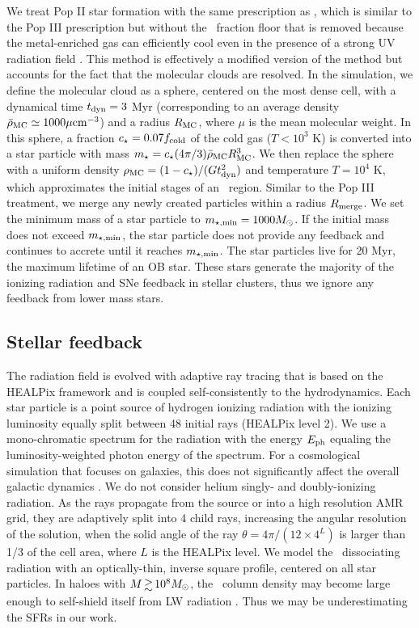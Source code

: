\documentclass[useAMS,usenatbib]{mn2e}
\begin{document}
We treat Pop II star formation with the same prescription as
\citet{Wise09}, which is similar to the Pop III prescription but
without the \hh~fraction floor that is removed because the
metal-enriched gas can efficiently cool even in the presence of a
strong UV radiation field \citep[e.g.][]{Safranek10}.  This method is
effectively a modified version of the \citet{Cen92} method but
accounts for the fact that the molecular clouds are resolved.  In the
simulation, we define the molecular cloud as a sphere, centered on the
most dense cell, with a dynamical time $t_{\rm dyn} = 3$ Myr
(corresponding to an average density $\bar{\rho}_{\rm MC} \simeq
1000\mu \cubecm$) and a radius $R_{\rm MC}$, where $\mu$ is the mean
molecular weight.  In this sphere, a fraction $c_\star = 0.07 f_{\rm
  cold}$ of the cold gas ($T < 10^3$ K) is converted into a star
particle with mass $m_\star = c_\star (4\pi/3) \bar{\rho}_{\rm MC}
R_{\rm MC}^3$.  We then replace the sphere with a uniform density
$\rho_{\rm MC} = (1 - c_\star) / (Gt_{\rm dyn}^2)$ and temperature $T
= 10^4$ K, which approximates the initial stages of an \hii~region.
Similar to the Pop III treatment, we merge any newly created particles
within a radius $R_{\rm merge}$.  We set the minimum mass of a star
particle to $m_{\rm \star, min} = 1000 \Ms$.  If the initial mass does
not exceed $m_{\rm \star, min}$, the star particle does not provide
any feedback and continues to accrete until it reaches $m_{\rm \star,
  min}$.  The star particles live for 20 Myr, the maximum lifetime of
an OB star.  These stars generate the majority of the ionizing
radiation and SNe feedback in stellar clusters, thus we ignore any
feedback from lower mass stars.

\subsection{Stellar feedback}

The radiation field is evolved with adaptive ray tracing
\citep{Abel02_RT, Wise10} that is based on the HEALPix framework
\citep{HEALPix} and is coupled self-consistently to the hydrodynamics.
Each star particle is a point source of hydrogen ionizing radiation
with the ionizing luminosity equally split between 48 initial rays
(HEALPix level 2).  We use a mono-chromatic spectrum for the radiation
with the energy $E_{\rm ph}$ equaling the luminosity-weighted photon
energy of the spectrum.  For a cosmological simulation that focuses on
galaxies, this does not significantly affect the overall galactic
dynamics \citep[see Sec. 6.3 in][]{Wise10}.  We do not consider helium
singly- and doubly-ionizing radiation.  As the rays propagate from the
source or into a high resolution AMR grid, they are adaptively split
into 4 child rays, increasing the angular resolution of the solution,
when the solid angle of the ray $\theta = 4\pi/(12 \times 4^{L})$ is
larger than 1/3 of the cell area, where $L$ is the HEALPix level.  We
model the \hh~dissociating radiation with an optically-thin, inverse
square profile, centered on all star particles.  In haloes with $M
\ga 10^8 \Ms$, the \hh~column density may become large enough to
self-shield itself from LW radiation \citep{Wise08_Gal}.  Thus we may
be underestimating the SFRs in our work.
\end{document}
